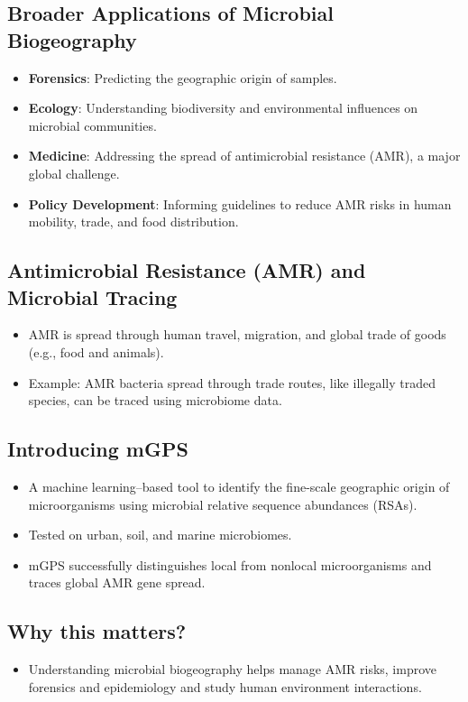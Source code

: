 \subsection{Broader Applications of Microbial Biogeography}
\begin{itemize}
    \item \textbf{Forensics}: Predicting the geographic origin of samples.
    \item \textbf{Ecology}: Understanding biodiversity and environmental influences on microbial communities.
    \item \textbf{Medicine}: Addressing the spread of antimicrobial resistance (AMR), a major global challenge.
    \item \textbf{Policy Development}: Informing guidelines to reduce AMR risks in human mobility, trade, and food distribution.
\end{itemize}

\subsection{Antimicrobial Resistance (AMR) and Microbial Tracing}
\begin{itemize}
    \item AMR is spread through human travel, migration, and global trade of goods (e.g., food and animals).
    \item Example: AMR bacteria spread through trade routes, like illegally traded species, can be traced using microbiome data.
\end{itemize}

\subsection{Introducing mGPS}
\begin{itemize}
    \item A machine learning–based tool to identify the fine-scale geographic origin of microorganisms using microbial relative sequence abundances (RSAs).
    \item Tested on urban, soil, and marine microbiomes.
    \item mGPS successfully distinguishes local from nonlocal microorganisms and traces global AMR gene spread.
\end{itemize}
\subsection{Why this matters?}
\begin{itemize}
    \item Understanding microbial biogeography helps manage AMR risks, improve forensics and epidemiology and study human environment interactions.
\end{itemize}